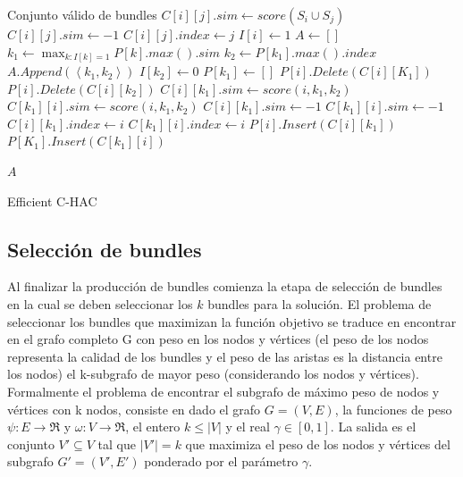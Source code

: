 \begin{algorithm}[H]
\begin{algorithmic}[1]
\ENSURE Conjunto válido de bundles
			\STATE $C[i][j].sim \leftarrow score(S_i \cup S_j)$
		\ELSE
			\STATE $C[i][j].sim \leftarrow -1$
		\ENDIF
		\STATE $C[i][j].index \leftarrow j$
	\ENDFOR
	\STATE $I[i] \leftarrow 1$
\ENDFOR
\STATE $A \leftarrow []$
	\STATE $k_1 \leftarrow \max_{k:I[k]=1}{P[k].max().sim}$
		\BREAK
	\ENDIF
	\STATE $k_2 \leftarrow P[k_1].max().index$
	\STATE $A.Append(\left\langle k_1,k_2 \right\rangle)$
	\STATE $I[k_2] \leftarrow 0$
	\STATE $P[k_1] \leftarrow []$
		\STATE $P[i].Delete(C[i][K_1])$
		\STATE $P[i].Delete(C[i][k_2])$
			\STATE $C[i][k_1].sim \leftarrow score(i,k_1,k_2)$
			\STATE $C[k_1][i].sim \leftarrow score(i,k_1,k_2)$
		\ELSE
			\STATE $C[i][k_1].sim \leftarrow -1$
			\STATE $C[k_1][i].sim \leftarrow -1$
		\ENDIF
		\STATE $C[i][k_1].index \leftarrow i$
		\STATE $C[k_1][i].index \leftarrow i$		
		\STATE $P[i].Insert(C[i][k_1])$
		\STATE $P[K_1].Insert(C[k_1][i])$		
	\ENDFOR
\ENDFOR

\RETURN $A$
\end{algorithmic}
\caption{Efficient C-HAC}\label{alg:Efficient C-HAC}
\end{algorithm}

\subsection{Selección de bundles}
Al finalizar la producción de bundles comienza la etapa de selección de bundles en la cual se deben seleccionar los $k$ bundles para la solución. El problema de seleccionar los bundles que maximizan la función objetivo se traduce en encontrar en el grafo completo G con peso en los nodos y vértices (el peso de los nodos representa la calidad de los bundles y el peso de las aristas es la distancia entre los nodos) el k-subgrafo de mayor peso (considerando los nodos y vértices).\\
Formalmente el problema de encontrar el subgrafo de máximo peso de nodos y vértices con k nodos, consiste en dado el grafo $ G = (V,E) $, la funciones de peso $\psi : E \rightarrow \Re$ y $\omega : V \rightarrow \Re$, el entero $ k \leq |V| $ y el real $\gamma \in [0,1]$. La salida es el conjunto $V' \subseteq V$ tal que $|V'| = k$ que maximiza el peso de los nodos y vértices del subgrafo $G' = (V', E')$ ponderado por el parámetro $\gamma$.

